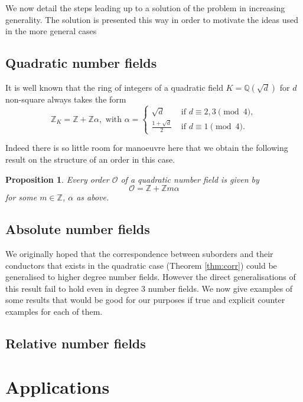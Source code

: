 \documentclass[a4paper,abstracton]{scrreprt}
\newtheorem{prop}{Proposition}
\theoremstyle{definition}
\newcommand{\QQ}{\mathbb{Q}}
\newcommand{\ZZ}{\mathbb{Z}}
\renewcommand{\O}{\mathcal{O}}
\begin{document}
We now detail the steps leading up to a solution of the problem in increasing generality.
The solution is presented this way in order to motivate the ideas used in the more general cases

\section{Quadratic number fields}

It is well known \cite{} that the ring of integers of a quadratic field $K = \QQ(\sqrt{d})$ for $d$ non-square always takes the form
\[\ZZ_K = \ZZ + \ZZ\alpha,\text{ with } \alpha =\begin{cases}
\sqrt{d}&\text{ if $d\equiv 2,3\pmod{4}$},\\
\frac{1+\sqrt{d}}{2}&\text{ if $d\equiv 1\pmod{4}$}.
\end{cases}\]

Indeed there is so little room for manoeuvre here that we obtain the following result on the structure of an order in this case.

\begin{prop}
Every order $\O$ of a quadratic number field is given by 
\[\O = \ZZ + \ZZ m\alpha\]
for some $m\in \ZZ$, $\alpha$ as above.
\end{prop}


\section{Absolute number fields}

We originally hoped that the correspondence between suborders and their conductors that exists in the quadratic case (Theorem \ref{thm:corr}) could be generalised to higher degree number fields.
However the direct generalisations of this result fail to hold even in degree 3 number fields.
We now give examples of some results that would be good for our purposes if true and explicit counter examples for each of them.


\section{Relative number fields}



\chapter{Applications}
\end{document}

